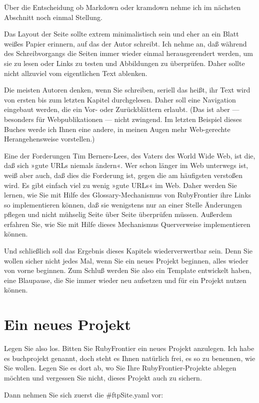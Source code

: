 \documentclass[11pt]{report}
\begin{document}
Über die Entscheidung ob Markdown oder kramdown nehme ich im nächsten
Abschnitt noch einmal Stellung.


Das Layout der Seite sollte extrem minimalistisch sein und eher an ein
Blatt weißes Papier erinnern, auf das der Autor schreibt. Ich nehme
an, daß während des Schreibvorgangs die Seiten immer wieder einmal
herausgerendert werden, um sie zu lesen oder Links zu testen und
Abbildungen zu überprüfen. Daher sollte nicht allzuviel vom
eigentlichen Text ablenken.


Die meisten Autoren denken, wenn Sie schreiben, seriell das heißt, ihr
Text wird von ersten bis zum letzten Kapitel durchgelesen. Daher soll
eine Navigation eingebaut werden, die ein Vor- oder Zurückblättern
erlaubt. (Das ist aber — besonders für Webpublikationen — nicht
zwingend. Im letzten Beispiel dieses Buches werde ich Ihnen eine
andere, in meinen Augen mehr Web-gerechte Herangehensweise
vorstellen.)


Eine der Forderungen Tim Berners-Lees, des Vaters des World Wide Web,
ist die, daß sich »gute URLs niemals ändern«. Wer schon länger im Web
unterwegs ist, weiß aber auch, daß dies die Forderung ist, gegen die
am häufigsten verstoßen wird. Es gibt einfach viel zu wenig »gute
URLs« im Web. Daher werden Sie lernen, wie Sie mit Hilfe des
Glossary-Mechanismus von RubyFrontier ihre Links so implementieren
können, daß sie wenigstens nur an einer Stelle Änderungen pflegen und
nicht mühselig Seite über Seite überprüfen müssen. Außerdem erfahren
Sie, wie Sie mit Hilfe dieses Mechanismus Querverweise implementieren
können.


Und schließlich soll das Ergebnis dieses Kapitels wiederverwertbar
sein. Denn Sie wollen sicher nicht jedes Mal, wenn Sie ein neues
Projekt beginnen, alles wieder von vorne beginnen. Zum Schluß werden
Sie also ein Template entwickelt haben, eine Blaupause, die Sie immer
wieder neu aufsetzen und für ein Projekt nutzen können.
\section{Ein neues Projekt}
\label{sec-2-6-3}


Legen Sie also los. Bitten Sie RubyFrontier ein neues Projekt
anzulegen. Ich habe es buchprojekt genannt, doch steht es Ihnen
natürlich frei, es so zu benennen, wie Sie wollen. Legen Sie es dort
ab, wo Sie Ihre RubyFrontier-Projekte ablegen möchten und vergessen
Sie nicht, dieses Projekt auch zu sichern.


Dann nehmen Sie sich zuerst die \#ftpSite.yaml vor:
\end{document}
